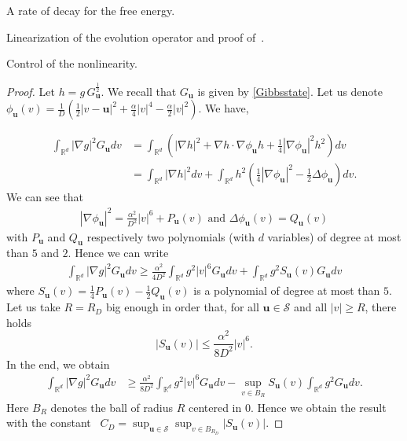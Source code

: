 \documentclass[reqno]{amsart} %
\begin{document}
\begin{section}{A rate of decay for the free energy.}
\begin{section}{Linearization of the evolution operator and proof of~\texorpdfstring{}{thm3}.}
\begin{subsection}{Control of the nonlinearity.}
\begin{proof} 
     Let $h=g\,G_\mathbf{u}^{\frac{1}{2}}$. We recall that $G_\mathbf{u}$ is given by \eqref{Gibbsstate}. Let us denote ~${\phi_\mathbf{u}(v)= \frac{1}{D}(\frac{1}{2}|v-\mathbf{u}|^2+ \frac{\alpha}{4}|v|^4-\frac{\alpha}{2}|v|^2)}.$ We have,

    \begin{align*}
        \int_{\mathbb{R}^d}|\nabla g|^2 G_\mathbf{u}dv 
        &=  \int_{\mathbb{R}^d}\left(|\nabla h |^2+ \nabla h \cdot \nabla \phi_{\mathbf{u}} h + \frac{1}{4} |\nabla \phi_\mathbf{u}|^2h^2\right)dv \\
         &= \int_{\mathbb{R}^d}|\nabla h |^2dv + \int_{\mathbb{R}^d} h^2\left( \frac{1}{4} |\nabla \phi_\mathbf{u}|^2- \frac{1}{2} \Delta  \phi_\mathbf{u}\right)dv.
    \end{align*}
We can see that
\begin{align*}
    |\nabla \phi_\mathbf{u}|^2= \frac{\alpha^2}{D^2}|v|^6+ P_\mathbf{u}(v) \text{ and } \Delta  \phi_\mathbf{u}(v)= Q_\mathbf{u}(v)
\end{align*}
with $P_\mathbf{u} $ and $Q_\mathbf{u} $ respectively two polynomials (with $d$ variables) of degree at most than $5$ and $2$. Hence we can write
\begin{align*}
     \int_{\mathbb{R}^d}|\nabla g|^2 G_\mathbf{u}dv \geq \frac{\alpha^2}{4D^2}\int_{\mathbb{R}^d}g^2|v|^6 G_\mathbf{u}dv+\int_{\mathbb{R}^d}g^2S_\mathbf{u}(v) G_\mathbf{u}dv
\end{align*}
where $S_\mathbf{u}(v)= \frac{1}{4}P_\mathbf{u}(v)-\frac{1}{2}Q_\mathbf{u}(v)$ is a polynomial of degree at most than $5$.
\\
Let us take $R=R_D$ big enough in order that, for all $\mathbf{u} \in \mathcal{S}$ and all $|v| \geq R$, there holds
\[|S_\mathbf{u}(v)|\leq \frac{\alpha^2}{8D^2}|v|^6.  \]
In the end, we obtain 
\begin{align*}
     \int_{\mathbb{R}^d}|\nabla g|^2 G_\mathbf{u}dv 
     &\geq \frac{\alpha^2}{8D^2}\int_{\mathbb{R}^d}g^2|v|^6 G_\mathbf{u}dv - \sup_{v\in B_R}S_\mathbf{u}(v)\int_{\mathbb{R}^d}g^2 G_\mathbf{u}dv.
\end{align*}
Here $B_R$ denotes the ball of radius $R$ centered in $0$.
 Hence we obtain the result with the constant \mbox{~$C_D= \sup_{\mathbf{u}\in \mathcal{S}} \sup_{v\in B_{R_D} }| S_\mathbf{u}(v)|$.}
\end{proof}


\end{subsection}
\end{section}
\end{section}
\end{document}
